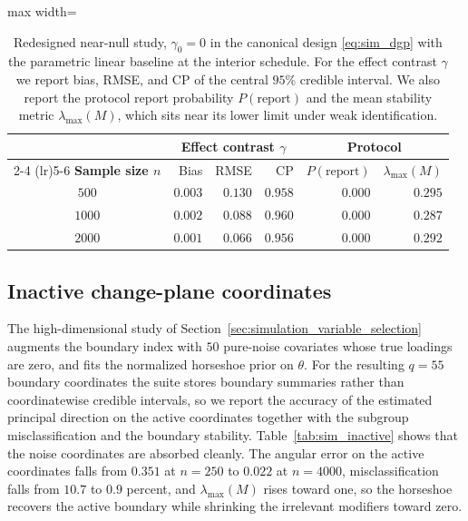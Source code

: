 \documentclass[11pt]{article}
\theoremstyle{definition}
\theoremstyle{plain}
\begin{document}
\begin{table}
  \centering
  \caption{Redesigned near-null study, $\gamma_0=0$ in the canonical design \eqref{eq:sim_dgp} with the parametric linear baseline at the interior schedule. For the effect contrast $\gamma$ we report bias, RMSE, and CP of the central $95\%$ credible interval. We also report the protocol report probability $P(\text{report})$ and the mean stability metric $\lambda_{\max}(M)$, which sits near its lower limit under weak identification.}
  \begin{adjustbox}{max width=\textwidth}
  \begin{tabular}{c rrr rr}
    \toprule
    & \multicolumn{3}{c}{Effect contrast $\gamma$} & \multicolumn{2}{c}{Protocol} \\
    \cmidrule(lr){2-4} \cmidrule(lr){5-6}
    \textbf{Sample size $n$} & Bias & RMSE & CP & $P(\text{report})$ & $\lambda_{\max}(M)$ \\
    \midrule
    $500$  & $0.003$ & $0.130$ & $0.958$ & $0.000$ & $0.295$ \\
    $1000$ & $0.002$ & $0.088$ & $0.960$ & $0.000$ & $0.287$ \\
    $2000$ & $0.001$ & $0.066$ & $0.956$ & $0.000$ & $0.292$ \\
    \bottomrule
  \end{tabular}
  \end{adjustbox}
  \label{tab:sim_near_null}
\end{table}

\subsection{Inactive change-plane coordinates}
\label{sec:sim_inactive}

The high-dimensional study of Section~\ref{sec:simulation_variable_selection} augments the boundary index with $50$ pure-noise covariates whose true loadings are zero, and fits the normalized horseshoe prior on $\theta$. For the resulting $q=55$ boundary coordinates the suite stores boundary summaries rather than coordinatewise credible intervals, so we report the accuracy of the estimated principal direction on the active coordinates together with the subgroup misclassification and the boundary stability. Table~\ref{tab:sim_inactive} shows that the noise coordinates are absorbed cleanly. The angular error on the active coordinates falls from $0.351$ at $n=250$ to $0.022$ at $n=4000$, misclassification falls from $10.7$ to $0.9$ percent, and $\lambda_{\max}(M)$ rises toward one, so the horseshoe recovers the active boundary while shrinking the irrelevant modifiers toward zero.
\end{document}
